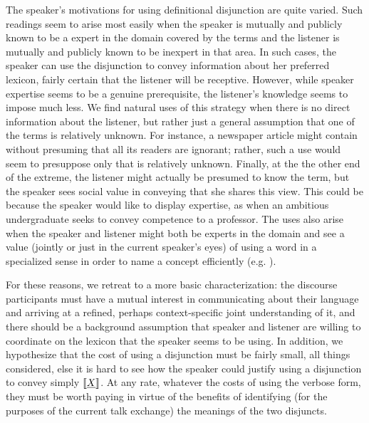 \documentclass{article}
\begin{document}
The speaker's motivations for using definitional disjunction are quite
varied. Such readings seem to arise most easily when the speaker is
mutually and publicly known to be a expert in the domain covered by
the terms and the listener is mutually and publicly known to be
inexpert in that area. In such cases, the speaker can use the
disjunction to convey information about her preferred lexicon, fairly
certain that the listener will be receptive. However, while speaker
expertise seems to be a genuine prerequisite, the listener's knowledge
seems to impose much less.  We find natural uses of this strategy when
there is no direct information about the listener, but rather just a
general assumption that one of the terms is relatively unknown. For
instance, a newspaper article might contain  without presuming that all its readers are ignorant;
rather, such a use would seem to presuppose only that 
is relatively unknown.  Finally, at the the other end of the extreme,
the listener might actually be presumed to know the term, but the
speaker sees social value in conveying that she shares this view. This
could be because the speaker would like to display expertise, as when
an ambitious undergraduate seeks to convey competence to a professor.
The uses also arise when the speaker and listener might both be
experts in the domain and see a value (jointly or just in the current
speaker's eyes) of using a word in a specialized sense in order to
name a concept efficiently (e.g. ).

For these reasons, we retreat to a more basic characterization: the
discourse participants must have a mutual interest in communicating
about their language and arriving at a refined, perhaps
context-specific joint understanding of it, and there should be a
background assumption that speaker and listener are willing to
coordinate on the lexicon that the speaker seems to be using. In
addition, we hypothesize that the cost of using a disjunction must be
fairly small, all things considered, else it is hard to see how the
speaker could justify using a disjunction  to convey
simply $\llbracket\emph{X}\rrbracket$. At any rate, whatever the costs of using the
verbose form, they must be worth paying in virtue of the benefits of
identifying (for the purposes of the current talk exchange) the
meanings of the two disjuncts.


\end{document}
